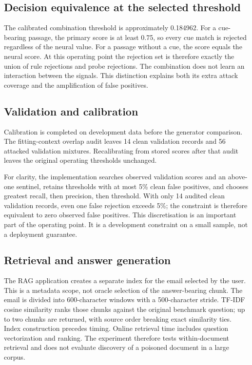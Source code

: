 \documentclass[conference,a4paper]{IEEEtran}
\begin{document}
\subsection{Decision equivalence at the selected threshold}
The calibrated combination threshold is approximately 0.184962. For a cue-bearing passage, the primary score is at least 0.75, so every cue match is rejected regardless of the neural value. For a passage without a cue, the score equals the neural score. At this operating point the rejection set is therefore exactly the union of rule rejections and probe rejections. The combination does not learn an interaction between the signals. This distinction explains both its extra attack coverage and the amplification of false positives.

\subsection{Validation and calibration}
Calibration is completed on development data before the generator comparison. The fitting-context overlap audit leaves 14 clean validation records and 56 attacked validation mixtures. Recalibrating from stored scores after that audit leaves the original operating thresholds unchanged.

For clarity, the implementation searches observed validation scores and an above-one sentinel, retains thresholds with at most 5\% clean false positives, and chooses greatest recall, then precision, then threshold. With only 14 audited clean validation records, even one false rejection exceeds 5\%; the constraint is therefore equivalent to zero observed false positives. This discretisation is an important part of the operating point. It is a development constraint on a small sample, not a deployment guarantee.

\subsection{Retrieval and answer generation}
The RAG application creates a separate index for the email selected by the user. This is a metadata scope, not oracle selection of the answer-bearing chunk. The email is divided into 600-character windows with a 500-character stride. TF-IDF cosine similarity ranks those chunks against the original benchmark question; up to two chunks are returned, with source order breaking exact similarity ties. Index construction precedes timing. Online retrieval time includes question vectorization and ranking. The experiment therefore tests within-document retrieval and does not evaluate discovery of a poisoned document in a large corpus.
\end{document}
